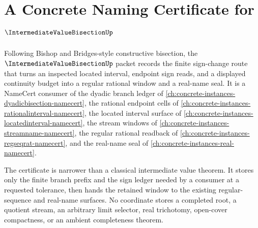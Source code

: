 \chapter{A Concrete Naming Certificate for $\IntermediateValueBisectionUp$}
\label{ch:concrete-instances-intermediate-value-bisection-namecert}

Following Bishop and Bridges-style constructive bisection, the $\IntermediateValueBisectionUp$ packet records the finite sign-change route that turns an inspected located interval, endpoint sign reads, and a displayed continuity budget into a regular rational window and a real-name seal. It is a NameCert consumer of the dyadic branch ledger of \autoref{ch:concrete-instances-dyadicbisection-namecert}, the rational endpoint cells of \autoref{ch:concrete-instances-rationalinterval-namecert}, the located interval surface of \autoref{ch:concrete-instances-locatedinterval-namecert}, the stream windows of \autoref{ch:concrete-instances-streamname-namecert}, the regular rational readback of \autoref{ch:concrete-instances-regseqrat-namecert}, and the real-name seal of \autoref{ch:concrete-instances-real-namecert}.

The certificate is narrower than a classical intermediate value theorem. It stores only the finite branch prefix and the sign ledger needed by a consumer at a requested tolerance, then hands the retained window to the existing regular-sequence and real-name surfaces. No coordinate stores a completed root, a quotient stream, an arbitrary limit selector, real trichotomy, open-cover compactness, or an ambient completeness theorem.

